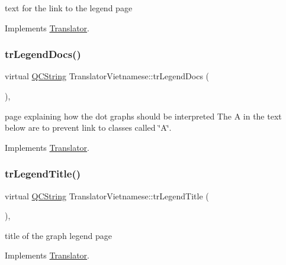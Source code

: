 text for the link to the legend page 

Implements \mbox{\hyperlink{class_translator}{Translator}}.

\mbox{\label{class_translator_vietnamese_a12899da5460b9a44d61d195a6212cfd6}} 
\subsubsection{\texorpdfstring{trLegendDocs()}{trLegendDocs()}}
{\footnotesize\ttfamily virtual \mbox{\hyperlink{class_q_c_string}{Q\+C\+String}} Translator\+Vietnamese\+::tr\+Legend\+Docs (\begin{DoxyParamCaption}{ }\end{DoxyParamCaption})\hspace{0.3cm}{\ttfamily [inline]}, {\ttfamily [virtual]}}

page explaining how the dot graph\textquotesingle{}s should be interpreted The A in the text below are to prevent link to classes called \char`\"{}\+A\char`\"{}. 

Implements \mbox{\hyperlink{class_translator}{Translator}}.

\mbox{\label{class_translator_vietnamese_a060b90bc4b06cacc580628a9ae85235f}} 
\subsubsection{\texorpdfstring{trLegendTitle()}{trLegendTitle()}}
{\footnotesize\ttfamily virtual \mbox{\hyperlink{class_q_c_string}{Q\+C\+String}} Translator\+Vietnamese\+::tr\+Legend\+Title (\begin{DoxyParamCaption}{ }\end{DoxyParamCaption})\hspace{0.3cm}{\ttfamily [inline]}, {\ttfamily [virtual]}}

title of the graph legend page 

Implements \mbox{\hyperlink{class_translator}{Translator}}.

\mbox{\label{class_translator_vietnamese_a4d5ed439b3d9a0b7b9c7ec0da45d8a45}} 
